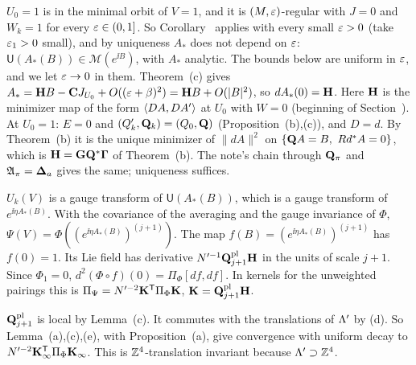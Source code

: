 \begin{detail}\label{d11a:D2}
\begin{step}[The minimal orbit near $V=1$]
$U_0=1$ is in the minimal orbit of $V=1$, and it is $(M,\varepsilon)$-regular with $J=0$ and $W_k=1$ for every $\varepsilon\in(0,1]$. So Corollary~ applies with every small $\varepsilon>0$ (take $\varepsilon_1>0$ small), and by uniqueness $A_*$ does not depend on $\varepsilon$: $\mathsf U(A_*(B))\in\mathscr M(e^{\ii B})$, with $A_*$ analytic. The bounds below are uniform in $\varepsilon$, and we let $\varepsilon\to0$ in them. Theorem~(c) gives $A_*=\mathbf H B-\mathbf C J_{U_0}+O((\varepsilon+\beta)^2)=\mathbf H B+O(|B|^2)$, so $dA_*(0)=\mathbf H$. Here $\mathbf H$ is the minimizer map of the form $\langle DA,DA'\rangle$ at $U_0$ with $W=0$ (beginning of Section~). At $U_0=1$: $E=0$ and $(Q'_k,\mathbf Q_k)=(Q_0,\mathbf Q)$ (Proposition~(b),(c)), and $D=d$. By Theorem~(b) it is the unique minimizer of $\|dA\|^2$ on $\{\mathbf Q A=B,\ Rd^*A=0\}$, which is $\mathbf H=\mathbf G\mathbf Q^*\boldsymbol\Gamma$ of Theorem~(b). The note's chain through $\mathbf Q_\pi$ and $\mathfrak A_\pi=\boldsymbol{\Delta}_a$ gives the same; uniqueness suffices.
\end{step}
\begin{step}
$U_k(V)$ is a gauge transform of $\mathsf U(A_*(B))$, which is a gauge transform of $e^{\ii\eta A_*(B)}$. With the covariance of the averaging and the gauge invariance of $\Phi$, $\Psi(V)=\Phi((e^{\ii\eta A_*(B)})^{(j+1)})$. The map $f(B)=(e^{\ii\eta A_*(B)})^{(j+1)}$ has $f(0)=1$. Its Lie field has derivative $N'^{-1}\mathbf Q^{\rm pl}_{j+1}\mathbf H$ in the units of scale $j+1$. Since $\Phi_1=0$, $d^2(\Phi\circ f)(0)=\Pi_\Phi[df,df]$. In kernels for the unweighted pairings this is $\Pi_\Psi=N'^{-2}\mathbf K^{\sf T}\Pi_\Phi\mathbf K$, $\mathbf K=\mathbf Q^{\rm pl}_{j+1}\mathbf H$.
\end{step}
\begin{step}
$\mathbf Q^{\rm pl}_{j+1}$ is local by Lemma~(c). It commutes with the translations of $\Lambda'$ by (d). So Lemma~(a),(c),(e), with Proposition~(a), give convergence with uniform decay to $N'^{-2}\mathbf K_\infty^{\sf T}\Pi_\Phi\mathbf K_\infty$. This is $\mathbb Z^4$-translation invariant because $\Lambda'\supset\mathbb Z^4$.
\end{step}
\end{detail}

